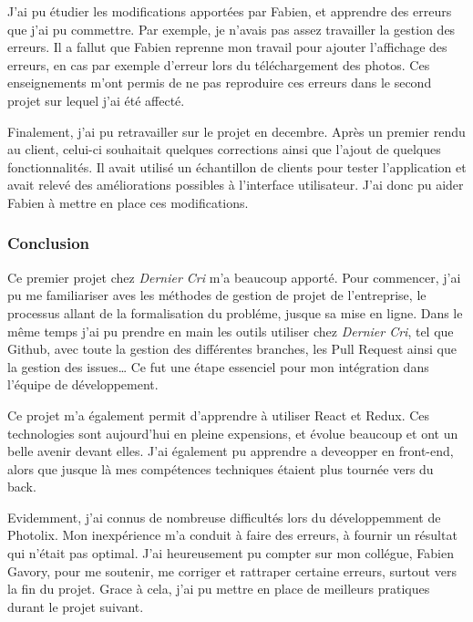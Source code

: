 \bigskip

J'ai pu étudier les modifications apportées par Fabien, et apprendre des
erreurs que j'ai pu commettre. Par exemple, je n'avais pas assez
travailler la gestion des erreurs. Il a fallut que Fabien reprenne mon
travail pour ajouter l'affichage des erreurs, en cas par exemple
d'erreur lors du téléchargement des photos. Ces enseignements m'ont
permis de ne pas reproduire ces erreurs dans le second projet sur lequel
j'ai été affecté.

\bigskip

Finalement, j'ai pu retravailler sur le projet en decembre. Après un
premier rendu au client, celui-ci souhaitait quelques corrections ainsi
que l'ajout de quelques fonctionnalités. Il avait utilisé un échantillon
de clients pour tester l'application et avait relevé des améliorations
possibles à l'interface utilisateur. J'ai donc pu aider Fabien à mettre
en place ces modifications.

\bigskip

\subsubsection{Conclusion}\label{conclusion}

\bigskip

Ce premier projet chez \emph{Dernier Cri} m'a beaucoup apporté. Pour
commencer, j'ai pu me familiariser aves les méthodes de gestion de
projet de l'entreprise, le processus allant de la formalisation du
probléme, jusque sa mise en ligne. Dans le même temps j'ai pu prendre en
main les outils utiliser chez \emph{Dernier Cri}, tel que Github, avec
toute la gestion des différentes branches, les Pull Request ainsi que la
gestion des issues\ldots{} Ce fut une étape essenciel pour mon
intégration dans l'équipe de développement.

\bigskip

Ce projet m'a également permit d'apprendre à utiliser React et Redux.
Ces technologies sont aujourd'hui en pleine expensions, et évolue
beaucoup et ont un belle avenir devant elles. J'ai également pu
apprendre a deveopper en front-end, alors que jusque là mes compétences
techniques étaient plus tournée vers du back.

\bigskip

Evidemment, j'ai connus de nombreuse difficultés lors du développemment
de Photolix. Mon inexpérience m'a conduit à faire des erreurs, à fournir
un résultat qui n'était pas optimal. J'ai heureusement pu compter sur
mon collégue, Fabien Gavory, pour me soutenir, me corriger et rattraper
certaine erreurs, surtout vers la fin du projet. Grace à cela, j'ai pu
mettre en place de meilleurs pratiques durant le projet suivant.

